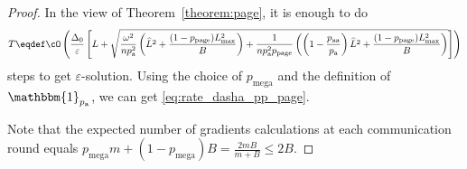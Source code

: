 \documentclass{article}
\newcommand*{\probavailable}{\ensuremath{p_{\textnormal{a}}}}
\newcommand*{\probpairaa}{\ensuremath{p_{\textnormal{aa}}}}
\newcommand*{\probpage}{\ensuremath{p_{\text{page}}}}
\newcommand*{\probmega}{\ensuremath{p_{\text{mega}}}}
\begin{document}
  \COROLLARYPAGE*

  \begin{proof}
    In the view of Theorem~\ref{theorem:page}, it is enough to do
    \begin{align*}
      T \eqdef \cO\left(\frac{\Delta_0}{\varepsilon}\left[L + \sqrt{\frac{\omega^2}{n \probavailable^2} \left(\widehat{L}^2 + \frac{(1 - \probpage)L_{\max}^2}{B}\right) + \frac{1}{n \probavailable^2 \probpage} \left(\left(1 - \frac{\probpairaa}{\probavailable}\right)\widehat{L}^2 + \frac{(1 - \probpage)L_{\max}^2}{B}\right)}\right]\right)
    \end{align*}
    steps to get $\varepsilon$-solution. Using the choice of $\probmega$ and the definition of $\mathbbm{1}_{\probavailable}$, we can get \eqref{eq:rate_dasha_pp_page}. 

    Note that the expected number of gradients calculations at each communication round equals $\probmega m + (1 - \probmega) B = \frac{2 m B}{m + B} \leq 2 B.$
  \end{proof}

  \COROLLARYPAGERANDK*
\end{document}
